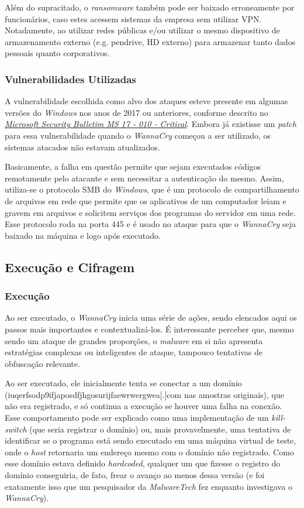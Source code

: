 \documentclass[12pt]{article}
\begin{document}
\noindent
Além do supracitado, o \textit{ransomware} também pode ser baixado erroneamente por funcionários, caso estes acessem sistemas da empresa sem utilizar VPN. Notadamente, ao utilizar redes públicas e/ou utilizar o mesmo dispositivo de armazenamento externo (e.g. pendrive, HD externo) para armazenar tanto dados pessoais quanto corporativos.

\subsubsection{Vulnerabilidades Utilizadas}
A vulnerabilidade escolhida como alvo dos ataques esteve presente em algumas versões do \textit{Windows} nos anos de 2017 ou anteriores, conforme descrito no \href{https://docs.microsoft.com/pt-br/security-updates/securitybulletins/2017/ms17-010}{\textit{Microsoft Security Bulletim MS 17 - 010 - Critical}}. Embora já existisse um \textit{patch} para essa vulnerabilidade quando o \textit{WannaCry} começou a ser utilizado, os sistemas atacados não estavam atualizados.

\noindent
Basicamente, a falha em questão permite que sejam executados códigos remotamente pelo atacante e sem necessitar a autenticação do mesmo. Assim, utiliza-se o protocolo SMB do \textit{Windows}, que é um protocolo de compartilhamento de arquivos em rede que permite que os aplicativos de um computador leiam e gravem em arquivos e solicitem serviços dos programas do servidor em uma rede. Esse protocolo roda na porta 445 e é usado no ataque para que o \textit{WannaCry} seja baixado na máquina e logo após executado.

\subsection{Execução e Cifragem}

\subsubsection{Execução}
Ao ser executado, o \textit{WannaCry} inicia uma série de ações, sendo elencados aqui os passos mais importantes e contextualizá-los. É interessante perceber que, mesmo sendo um ataque de grandes proporções, o \textit{malware} em si não apresenta estratégias complexas ou inteligentes de ataque, tampouco tentativas de obfuscação relevante.

\noindent
Ao ser executado, ele inicialmente tenta se conectar a um domínio (iuqerfsodp9ifjaposdfjhgosurijfaewrwergwea[.]com nas amostras originais), que não era registrado, e só continua a execução se houver uma falha na conexão. Esse comportamento pode ser explicado como uma implementação de um \textit{kill-switch} (que seria registrar o domínio) ou, mais provavelmente, uma tentativa de identificar se o programa está sendo executado em uma máquina virtual de teste, onde o \textit{host} retornaria um endereço mesmo com o domínio não registrado. Como esse domínio estava definido \textit{hardcoded}, qualquer um que fizesse o registro do domínio conseguiria, de fato, frear o avanço ao menos dessa versão (e foi exatamente isso que um pesquisador da \textit{MalwareTech} fez enquanto investigava o \textit{WannaCry}).
\end{document}
